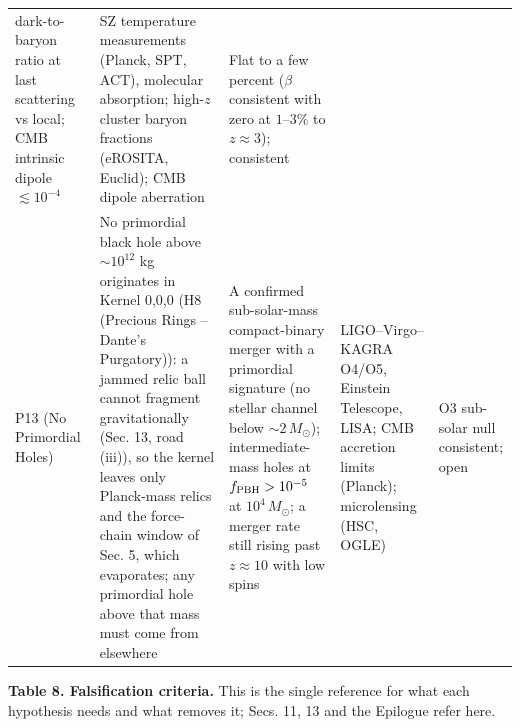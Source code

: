 \documentclass[
  11pt,
]{article}
\begin{document}
\begin{longtable}[]{@{}lllll@{}}
\begin{minipage}[t]{0.19\columnwidth}
dark-to-baryon ratio at last scattering vs local; CMB intrinsic dipole
\(\lesssim 10^{-4}\)\strut
\end{minipage} & \begin{minipage}[t]{0.19\columnwidth}\raggedright
SZ temperature measurements (Planck, SPT, ACT), molecular absorption;
high-\(z\) cluster baryon fractions (eROSITA, Euclid); CMB dipole
aberration\strut
\end{minipage} & \begin{minipage}[t]{0.19\columnwidth}\raggedright
Flat to a few percent (\(\beta\) consistent with zero at \(1\)--\(3\%\)
to \(z \approx 3\)); consistent\strut
\end{minipage}\tabularnewline
\begin{minipage}[t]{0.11\columnwidth}\raggedright
P13 (No Primordial Holes)\strut
\end{minipage} & \begin{minipage}[t]{0.19\columnwidth}\raggedright
No primordial black hole above \(\sim 10^{12}\) kg originates in Kernel
0,0,0 (H8 (Precious Rings -- Dante's Purgatory)): a jammed relic ball
cannot fragment gravitationally (Sec. 13, road (iii)), so the kernel
leaves only Planck-mass relics and the force-chain window of Sec. 5,
which evaporates; any primordial hole above that mass must come from
elsewhere\strut
\end{minipage} & \begin{minipage}[t]{0.19\columnwidth}\raggedright
A confirmed sub-solar-mass compact-binary merger with a primordial
signature (no stellar channel below \(\sim 2\,M_\odot\));
intermediate-mass holes at \(f_{\rm PBH} > 10^{-5}\) at
\(10^4\,M_\odot\); a merger rate still rising past \(z \approx 10\) with
low spins\strut
\end{minipage} & \begin{minipage}[t]{0.19\columnwidth}\raggedright
LIGO--Virgo--KAGRA O4/O5, Einstein Telescope, LISA; CMB accretion limits
(Planck); microlensing (HSC, OGLE)\strut
\end{minipage} & \begin{minipage}[t]{0.19\columnwidth}\raggedright
O3 sub-solar null consistent; open\strut
\end{minipage}\tabularnewline
\bottomrule
\end{longtable}

\textbf{Table 8. Falsification criteria.} This is the single reference
for what each hypothesis needs and what removes it; Secs. 11, 13 and the
Epilogue refer here.
\end{document}
